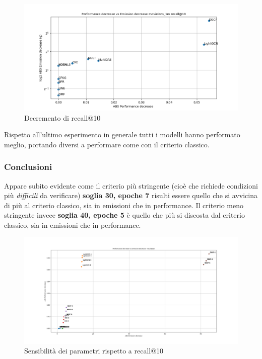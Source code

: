 \begin{figure}[H]
    \centering
     \includegraphics[width=\textwidth]{images/decrement_recall@10_movielens_1m_30_7.png}
    \caption{Decremento di recall@10}
\end{figure}

\noindent Rispetto all'ultimo esperimento in generale tutti i modelli hanno performato meglio, portando diversi a performare come con il criterio classico.

\subsubsection{Conclusioni}

Appare subito evidente come il criterio più stringente (cioè che richiede condizioni più \textit{difficili} da verificare) \textbf{soglia 30, epoche 7} risulti essere quello che si avvicina di più al criterio classico, sia in emissioni che in performance. Il criterio meno stringente invece \textbf{soglia 40, epoche 5} è quello che più si discosta dal criterio classico, sia in emissioni che in performance.\\


\begin{figure}[H]
    \includegraphics[width=\textwidth]{images/sensibility_recall@10.png}
    \caption{Sensibilità dei parametri rispetto a recall@10}
\end{figure}

